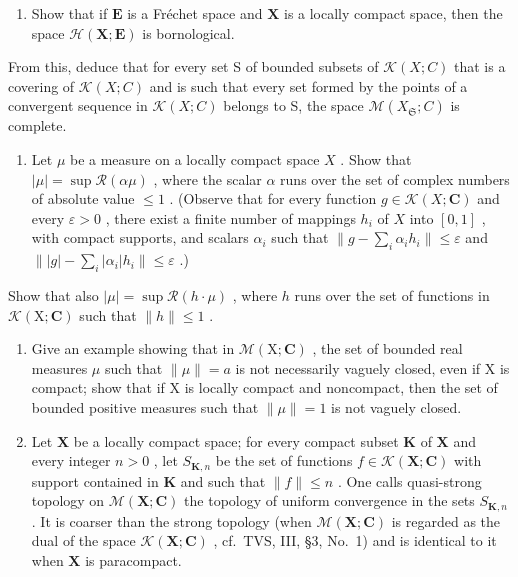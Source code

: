 \begin{enumerate}
\def\labelenumi{\arabic{enumi})}
\setcounter{enumi}{4}
\tightlist
\item
  Show that if \(\mathbf{E}\) is a Fréchet space and \(\mathbf{X}\) is a locally compact space, then the space \(\mathcal{H}(\mathbf{X};\mathbf{E})\) is bornological.
\end{enumerate}

From this, deduce that for every set S of bounded subsets of \(\mathcal{K}(X;C)\) that is a covering of \(\mathcal{K}(X;C)\) and is such that every set formed by the points of a convergent sequence in \(\mathcal{K}(X;C)\) belongs to S, the space \(\mathcal{M}(X_{\mathfrak{S}};C)\) is complete.

\begin{enumerate}
\def\labelenumi{\arabic{enumi})}
\setcounter{enumi}{5}
\tightlist
\item
  Let \(\mu\) be a measure on a locally compact space \(X\) . Show that \(|\mu| = \sup \mathcal{R}(\alpha \mu)\) , where the scalar \(\alpha\) runs over the set of complex numbers of absolute value \(\leqslant 1\) . (Observe that for every function \(g \in \mathcal{K}(X; \mathbf{C})\) and every \(\varepsilon > 0\) , there exist a finite number of mappings \(h_i\) of \(X\) into \([0,1]\) , with compact supports, and scalars \(\alpha_i\) such that \(\| g - \sum_{i} \alpha_i h_i \| \leqslant \varepsilon\) and \(\| |g| - \sum_{i} |\alpha_i| h_i \| \leqslant \varepsilon\) .)
\end{enumerate}

Show that also \(|\mu| = \sup \mathcal{R}(h \cdot \mu)\) , where \(h\) runs over the set of functions in \(\mathcal{K}(\mathrm{X};\mathbf{C})\) such that \(\| h\| \leqslant 1\) .

\begin{enumerate}
\def\labelenumi{\arabic{enumi})}
\setcounter{enumi}{6}
\item
  Give an example showing that in \(\mathcal{M}(\mathrm{X};\mathbf{C})\) , the set of bounded real measures \(\mu\) such that \(\|\mu\|=a\) is not necessarily vaguely closed, even if X is compact; show that if X is locally compact and noncompact, then the set of bounded positive measures such that \(\|\mu\|=1\) is not vaguely closed.
\item
  Let \(\mathbf{X}\) be a locally compact space; for every compact subset \(\mathbf{K}\) of \(\mathbf{X}\) and every integer \(n > 0\) , let \(S_{\mathbf{K},n}\) be the set of functions \(f \in \mathcal{K}(\mathbf{X};\mathbf{C})\) with support contained in \(\mathbf{K}\) and such that \(\| f\| \leqslant n\) . One calls quasi-strong topology on \(\mathcal{M}(\mathbf{X};\mathbf{C})\) the topology of uniform convergence in the sets \(S_{\mathbf{K},n}\) . It is coarser than the strong topology (when \(\mathcal{M}(\mathbf{X};\mathbf{C})\) is regarded as the dual of the space \(\mathcal{K}(\mathbf{X};\mathbf{C})\) , cf.~TVS, III, §3, No.~1) and is identical to it when \(\mathbf{X}\) is paracompact.
\end{enumerate}

